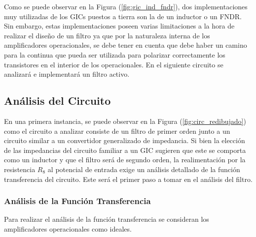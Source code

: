 
Como se puede observar en la Figura (\ref{fig:gic_ind_fndr}), dos implementaciones muy utilizadas de los GICs puestos a tierra son la de un inductor o un FNDR. Sin embargo, estas implementaciones poseen varias limitaciones a la hora de realizar el diseño de un filtro ya que por la naturaleza interna de los amplificadores operacionales, se debe tener en cuenta que debe haber un camino para la continua que pueda ser utilizada para polarizar correctamente los transistores en el interior de los operacionales. En el siguiente circuito se analizará e implementará un filtro activo.


\subsection{Análisis del Circuito}

En una primera instancia, se puede observar en la Figura (\ref{fig:circ_redibujado}) como el circuito a analizar consiste de un filtro de primer orden junto a un circuito similar a un convertidor generalizado de impedancia. Si bien la elección de las impedancias del circuito familiar a un GIC sugieren que este se comporta como un inductor y que el filtro será de segundo orden, la realimentación por la resistencia $R_8$ al potencial de entrada exige un análisis detallado de la función transferencia del circuito. Este será el primer paso a tomar en el análisis del filtro.

\subsubsection{Análisis de la Función Transferencia}
\label{sec:fun_trans}
Para realizar el análisis de la función transferencia se consideran los amplificadores operacionales como ideales.


